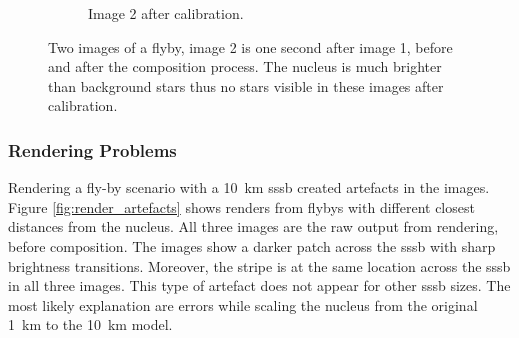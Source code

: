 \begin{figure}[htb]
\begin{subfigure}[b]{0.48\textwidth}
                \caption{Image 2 after calibration.}
                \label{fig:composition_after_2}
        \end{subfigure}
        \caption{Two images of a flyby, image 2 is one second after image 1, before and after the composition process. The nucleus is much brighter than background stars thus no stars visible in these images after calibration.}
        \label{fig:composition_before_after}
\end{figure}

\subsubsection{Rendering Problems}
Rendering a fly-by scenario with a \SI{10}{\kilo\meter} \gls{sssb} created artefacts in the images. Figure \ref{fig:render_artefacts} shows renders from flybys with different closest distances from the nucleus. All three images are the raw output from rendering, before composition. The images show a darker patch across the \gls{sssb} with sharp brightness transitions. Moreover, the stripe is at the same location across the \gls{sssb} in all three images. This type of artefact does not appear for other \gls{sssb} sizes. The most likely explanation are errors while scaling the nucleus from the original \SI{1}{\kilo\meter} to the \SI{10}{\kilo\meter} model.
